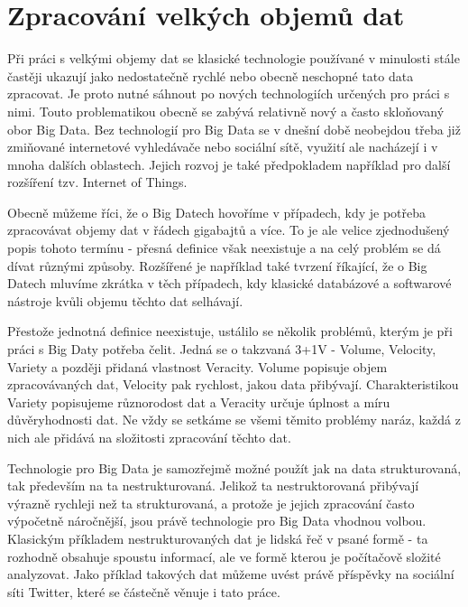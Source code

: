 \documentclass[thesis=B,czech]{FITthesis}[2012/06/26]
\begin{document}
\section{Zpracování velkých objemů dat}
	Při práci s velkými objemy dat se klasické technologie používané v minulosti stále častěji ukazují jako nedostatečně rychlé nebo obecně neschopné tato data zpracovat. Je proto nutné sáhnout po nových technologiích určených pro práci s nimi. Touto problematikou obecně se zabývá relativně nový a často skloňovaný obor Big Data. Bez technologií pro Big Data se v dnešní době neobejdou třeba již zmiňované internetové vyhledávače nebo sociální sítě, využití ale nacházejí i v mnoha dalších oblastech. Jejich rozvoj je také předpokladem například pro další rozšíření tzv. Internet of Things\cite{bigdata-iot}.  

	Obecně můžeme říci, že o Big Datech hovoříme v případech, kdy je potřeba zpracovávat objemy dat v řádech gigabajtů a více. To je ale velice zjednodušený popis tohoto termínu - přesná definice však neexistuje a na celý problém se dá dívat různými způsoby. Rozšířené je například také tvrzení říkající, že o Big Datech mluvíme zkrátka v těch případech, kdy klasické databázové a softwarové nástroje kvůli objemu těchto dat selhávají\cite{webopedia-bigdata}. 

	Přestože jednotná definice neexistuje, ustálilo se několik problémů, kterým je při práci s Big Daty potřeba čelit. Jedná se o takzvaná 3+1V - Volume, Velocity, Variety a později přidaná vlastnost Veracity\cite{dp-customer-inteligence}. Volume popisuje objem zpracovávaných dat, Velocity pak rychlost, jakou data přibývají. Charakteristikou Variety popisujeme různorodost dat a Veracity určuje úplnost a míru důvěryhodnosti dat. Ne vždy se setkáme se všemi těmito problémy naráz, každá z nich ale přidává na složitosti zpracování těchto dat. 
	
 Technologie pro Big Data je samozřejmě možné použít jak na data strukturovaná, tak především na ta nestrukturovaná. Jelikož ta nestruktorovaná přibývají výrazně rychleji než ta strukturovaná\cite{structured-unstructured}, a protože je jejich zpracování často výpočetně náročnější, jsou právě technologie pro Big Data vhodnou volbou. Klasickým příkladem nestrukturovaných dat je lidská řeč v psané formě - ta rozhodně obsahuje spoustu informací, ale ve formě kterou je počítačově složité analyzovat. Jako příklad takových dat můžeme uvést právě příspěvky na sociální síti Twitter, které se částečně věnuje i tato práce. 
 
\end{document}
